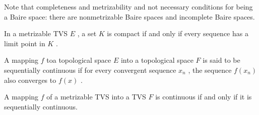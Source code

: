\begin{rmk}
	Note that completeness and metrizability and not necessary conditions for being a Baire space: there are nonmetrizable Baire spaces and incomplete Baire spaces.
\end{rmk}

\begin{prop}
	In a metrizable TVS $ E $ , a set $ K $ is compact if and only if every sequence has a limit point in $ K $ .
\end{prop}

\begin{defn}
	A mapping $ f $ toa  topological space $ E $ into a topological space $ F $ is said to be sequentially continuous if for every convergent sequence $ x_{ n } $ , the sequence $ f(x_{ n }) $ also converges to $ f(x) $ .
\end{defn}

\begin{prop}
	A mapping $ f $ of a metrizable TVS into a TVS $ F $ is continuous if and only if it is sequentially continuous.
\end{prop}

